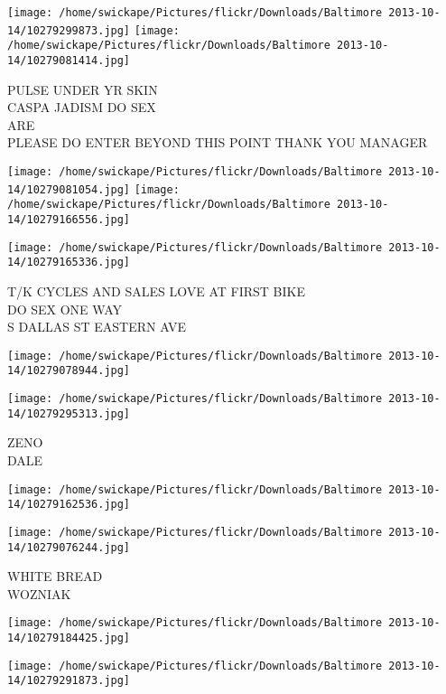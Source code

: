\documentclass[10pt,letterpaper]{article}
\begin{document}
\texttt{[image: /home/swickape/Pictures/flickr/Downloads/Baltimore 2013-10-14/10279299873.jpg]}
\texttt{[image: /home/swickape/Pictures/flickr/Downloads/Baltimore 2013-10-14/10279081414.jpg]}

PULSE UNDER YR SKIN\\
CASPA JADISM DO SEX\\
ARE\\
PLEASE DO ENTER BEYOND THIS POINT THANK YOU MANAGER\\
\pagebreak

\texttt{[image: /home/swickape/Pictures/flickr/Downloads/Baltimore 2013-10-14/10279081054.jpg]}
\texttt{[image: /home/swickape/Pictures/flickr/Downloads/Baltimore 2013-10-14/10279166556.jpg]}

\texttt{[image: /home/swickape/Pictures/flickr/Downloads/Baltimore 2013-10-14/10279165336.jpg]}

T/K CYCLES AND SALES LOVE AT FIRST BIKE\\
DO SEX ONE WAY\\
S DALLAS ST EASTERN AVE\\
\pagebreak

\texttt{[image: /home/swickape/Pictures/flickr/Downloads/Baltimore 2013-10-14/10279078944.jpg]}

\vspace{0.25in}
\texttt{[image: /home/swickape/Pictures/flickr/Downloads/Baltimore 2013-10-14/10279295313.jpg]}

ZENO\\
DALE\\
\pagebreak

\texttt{[image: /home/swickape/Pictures/flickr/Downloads/Baltimore 2013-10-14/10279162536.jpg]}

\vspace{0.25in}
\texttt{[image: /home/swickape/Pictures/flickr/Downloads/Baltimore 2013-10-14/10279076244.jpg]}

WHITE BREAD\\
WOZNIAK\\
\pagebreak

\texttt{[image: /home/swickape/Pictures/flickr/Downloads/Baltimore 2013-10-14/10279184425.jpg]}

\vspace{0.25in}
\texttt{[image: /home/swickape/Pictures/flickr/Downloads/Baltimore 2013-10-14/10279291873.jpg]}
\end{document}
